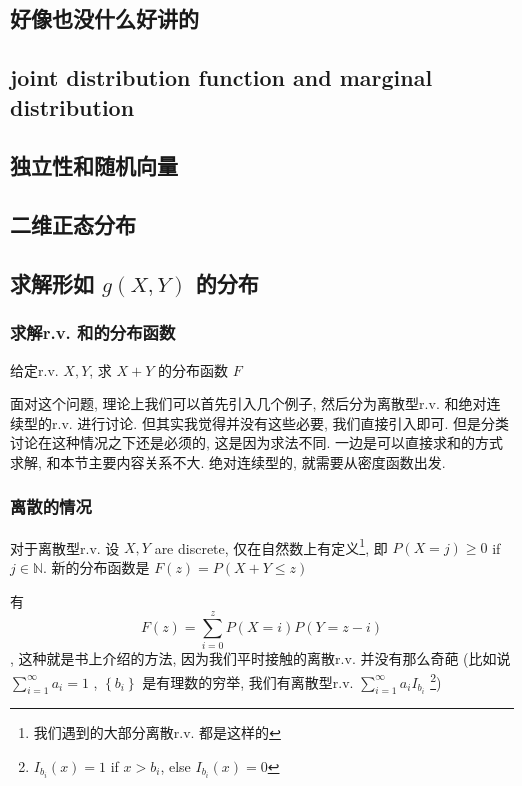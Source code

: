 \documentclass[a4paper, 10pt]{ctexart} %
\begin{document}
\subsection{好像也没什么好讲的}
\subsection{joint distribution function and marginal distribution}
\subsection{独立性和随机向量}
\subsection{二维正态分布}

\subsection{求解形如 $g \left(X, Y\right)$ 的分布}
\subsubsection{求解r.v. 和的分布函数}
给定r.v. $X,  Y$, 求 $X + Y$ 的分布函数 $F$

面对这个问题, 理论上我们可以首先引入几个例子, 然后分为离散型r.v. 和绝对连续型的r.v. 进行讨论. 
但其实我觉得并没有这些必要, 我们直接引入即可. 
但是分类讨论在这种情况之下还是必须的, 这是因为求法不同. 一边是可以直接求和的方式求解, 和本节主要内容关系不大. 绝对连续型的, 就需要从密度函数出发.
\subsubsection{离散的情况}

对于离散型r.v. 设 $X, Y$ are discrete, 仅在自然数上有定义\footnote{我们遇到的大部分离散r.v. 都是这样的}, 即 $P\left(X = j\right) \ge  0 $ if $j \in \mathbb{N}$. 新的分布函数是 $F \left(z\right) = P\left(X + Y \le z\right)$ 

有 $$F \left(z\right) = \sum_{i = 0 } ^{ z} P \left(X = i\right) P\left(Y = z - i\right) $$, 这种就是书上介绍的方法, 因为我们平时接触的离散r.v. 并没有那么奇葩 (比如说 $\sum_{i =1} ^{\infty} a_i = 1$ , $\left\{b_i\right\}$ 是有理数的穷举, 我们有离散型r.v. $\sum_{i=1}  ^{\infty} a_i I _{b_i}$ \footnote{$I_{b_i} \left(x\right)= 1$ if $x > b_i$, else $I _{b_i} \left(x\right) = 0$})
\end{document}
